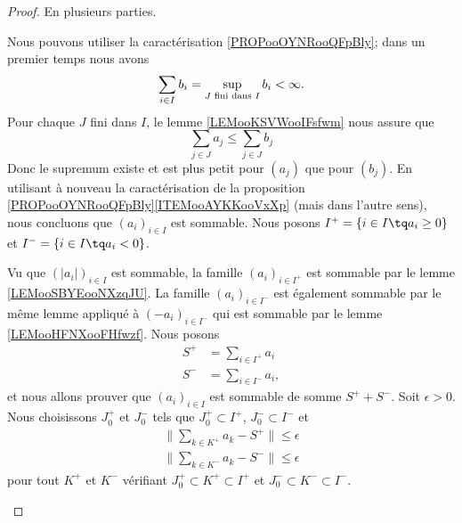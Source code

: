 \begin{proof}
	En plusieurs parties.
	\begin{subproof}
		Nous pouvons utiliser la caractérisation \ref{PROPooOYNRooQFpBly}; dans un premier temps nous avons
		\begin{equation}
			\sum_{i\in I}b_i=\sup_{\text{\( J\) fini dans \( I\)}}b_i<\infty.
		\end{equation}
		Pour chaque \( J\) fini dans \( I\), le lemme \ref{LEMooKSVWooIFsfwm} nous assure que
		\begin{equation}
			\sum_{j\in J}a_j\leq \sum_{j\in J}b_j
		\end{equation}
		Donc le supremum existe et est plus petit pour \( (a_j)\) que pour \( (b_j)\). En utilisant à nouveau la caractérisation de la proposition \ref{PROPooOYNRooQFpBly}\ref{ITEMooAYKKooVxXp} (mais dans l'autre sens), nous concluons que \( (a_i)_{i\in I}\) est sommable.
		Nous posons \( I^+=\{ i\in I\tq a_i\geq 0 \}\) et \( I^-=\{ i\in I\tq a_i<0 \}\).

		Vu que \( (| a_i |)_{i\in I}\) est sommable, la famille \( (a_i)_{i\in I^+}\) est sommable par le lemme \ref{LEMooSBYEooNXzqJU}. La famille \( (a_i)_{i\in I^-}\) est également sommable par le même lemme appliqué à \( (-a_i)_{i\in I^-}\) qui est sommable par le lemme \ref{LEMooHFNXooFHfwzf}. Nous posons
		\begin{subequations}
			\begin{align}
				S^+ & =\sum_{i\in I^+}a_i  \\
				S^- & =\sum_{i\in I^-}a_i,
			\end{align}
		\end{subequations}
		et nous allons prouver que \( (a_i)_{i\in I}\) est sommable de somme \( S^++S^-\). Soit \( \epsilon>0\). Nous choisissons \( J_0^+\) et \( J_0^-\) tels que \( J_0^+\subset I^+\), \( J_0^-\subset I^-\) et
		\begin{subequations}
			\begin{align}
				\| \sum_{k\in K^+}a_k- S^+ \|\leq \epsilon \\
				\| \sum_{k\in K^-}a_k- S^- \|\leq \epsilon
			\end{align}
		\end{subequations}
		pour tout \( K^+\) et \( K^-\) vérifiant \( J_0^+\subset K^+\subset I^+\) et \( J_0^-\subset K^-\subset I^-\).


\end{subproof}
\end{proof}
